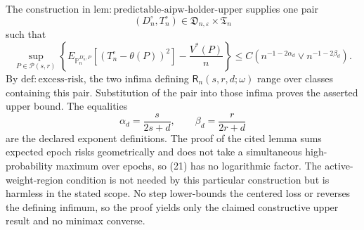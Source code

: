 The construction in \(\mathrm{lem{:}predictable\text{-}aipw\text{-}holder\text{-}upper}\) supplies one pair
\[
(D_n^{\circ},T_n^{\circ})\in
\mathfrak D_{n,\varepsilon}\times\mathfrak T_n
\]
such that
\[
\sup_{P\in\mathcal P(s,r)}
\left\{
E_{\mathbb P_n^{D_n^{\circ},P}}
[(T_n^{\circ}-\theta(P))^2]-\frac{V^*(P)}n
\right\}
\leq C\left(n^{-1-2\alpha_d}\vee n^{-1-2\beta_d}\right).
\tag{21}
\]
By \(\mathrm{def{:}excess\text{-}risk}\), the two infima defining \(\mathsf R_n(s,r,d;\omega)\) range over classes containing this pair.  Substitution of the pair into those infima proves the asserted upper bound.  The equalities
\[
\alpha_d=\frac{s}{2s+d},\qquad
\beta_d=\frac{r}{2r+d}
\]
are the declared exponent definitions.  The proof of the cited lemma sums expected epoch risks geometrically and does not take a simultaneous high-probability maximum over epochs, so (21) has no logarithmic factor.  The active-weight-region condition is not needed by this particular construction but is harmless in the stated scope.  No step lower-bounds the centered loss or reverses the defining infimum, so the proof yields only the claimed constructive upper result and no minimax converse.